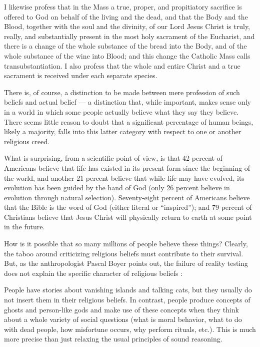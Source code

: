 \documentclass[a4paper,14pt]{extarticle}
\begin{document}
I likewise profess that in the Mass a true, proper, and propitiatory sacrifice is offered to God on behalf of the living and the dead, and that the Body and the Blood, together with the soul and the divinity, of our Lord Jesus Christ is truly, really, and substantially present in the most holy sacrament of the Eucharist, and there is a change of the whole substance of the bread into the Body, and of the whole substance of the wine into Blood;
and this change the Catholic Mass calls transubstantiation.
I also profess that the whole and entire Christ and a true sacrament is received under each separate species.

There is, of course, a distinction to be made between mere profession of such beliefs and actual belief --- a distinction that, while important, makes sense only in a world in which some people actually believe what they say they believe.
There seems little reason to doubt that a significant percentage of human beings, likely a majority, falls into this latter category with respect to one or another religious creed.

What is surprising, from a scientific point of view, is that 42 percent of Americans believe that life has existed in its present form since the beginning of the world, and another 21 percent believe that while life may have evolved, its evolution has been guided by the hand of God (only 26 percent believe in evolution through natural selection).
Seventy-eight percent of Americans believe that the Bible is the word of God (either literal or ``inspired'');
and 79 percent of Christians believe that Jesus Christ will physically return to earth at some point in the future.

How is it possible that so many millions of people believe these things?
Clearly, the taboo around criticizing religious beliefs must contribute to their survival.
But, as the anthropologist Pascal Boyer points out, the failure of reality testing does not explain the specific character of religious beliefs :

People have stories about vanishing islands and talking cats, but they usually do not insert them in their religious beliefs.
In contrast, people produce concepts of ghosts and person-like gods and make use of these concepts when they think about a whole variety of social questions (what is moral behavior, what to do with dead people, how misfortune occurs, why perform rituals, etc.).
This is much more precise than just relaxing the usual principles of sound reasoning.
\end{document}
